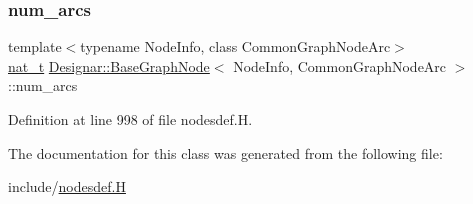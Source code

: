 \mbox{\label{class_designar_1_1_base_graph_node_a035347b8e1ffaca5df73b42bef300e0f}} 
\subsubsection{\texorpdfstring{num\+\_\+arcs}{num\_arcs}}
{\footnotesize\ttfamily template$<$typename Node\+Info, class Common\+Graph\+Node\+Arc$>$ \\
\hyperlink{namespace_designar_aa72662848b9f4815e7bf31a7cf3e33d1}{nat\+\_\+t} \hyperlink{class_designar_1_1_base_graph_node}{Designar\+::\+Base\+Graph\+Node}$<$ Node\+Info, Common\+Graph\+Node\+Arc $>$\+::num\+\_\+arcs\hspace{0.3cm}{\ttfamily [protected]}}



Definition at line 998 of file nodesdef.\+H.



The documentation for this class was generated from the following file\+:\begin{DoxyCompactItemize}
\item 
include/\hyperlink{nodesdef_8_h}{nodesdef.\+H}\end{DoxyCompactItemize}
